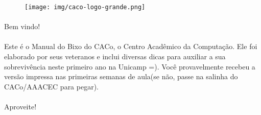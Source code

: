 \documentclass[a4paper,10pt, twocolumn, twoside, titlepage]{article}
\begin{document}
\thispagestyle{empty}


\onecolumn

\begin{figure}
    \centering
    \texttt{[image: img/caco-logo-grande.png]}
\end{figure}

\paragraph{}
Bem vindo!

\paragraph{}
Este é o Manual do Bixo do CACo, o Centro Acadêmico da Computação.
Ele foi elaborado por seus veteranos e inclui diversas dicas para auxiliar a sua
sobrevivência neste primeiro ano na Unicamp =).
Você provavelmente recebeu a versão impressa nas primeiras semanas de aula(se
não, passe na salinha do CACo/AAACEC para pegar).

\paragraph{}
Aproveite!

\clearpage

\tableofcontents
\clearpage
\onecolumn



\clearpage

\onecolumn



\clearpage



\clearpage

\twocolumn






















\end{document}
